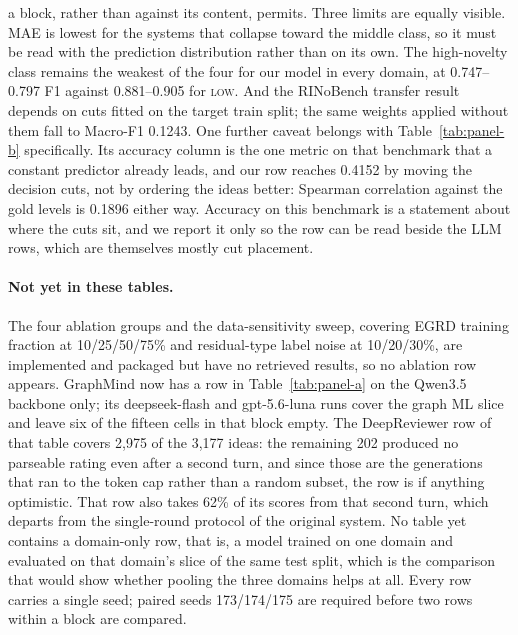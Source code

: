 a block, rather than against its content, permits.
Three limits are equally visible. MAE is lowest for the systems that collapse
toward the middle class, so it must be read with the prediction distribution
rather than on its own. The high-novelty class remains the weakest of the four
for our model in every domain, at 0.747--0.797 F1 against 0.881--0.905 for
\textsc{low}. And the RINoBench transfer result depends on cuts fitted on the
target train split; the same weights applied without them fall to Macro-F1
0.1243.
One further caveat belongs with Table~\ref{tab:panel-b} specifically. Its
accuracy column is the one metric on that benchmark that a constant predictor
already leads, and our row reaches 0.4152 by moving the decision cuts, not by
ordering the ideas better: Spearman correlation against the gold levels is
0.1896 either way. Accuracy on this benchmark is a statement about where the
cuts sit, and we report it only so the row can be read beside the LLM rows,
which are themselves mostly cut placement.

\paragraph{Not yet in these tables.}
The four ablation groups and the data-sensitivity sweep, covering EGRD training
fraction at 10/25/50/75\% and residual-type label noise at 10/20/30\%, are
implemented and packaged but have no retrieved results, so no ablation row
appears. GraphMind now has a row in Table~\ref{tab:panel-a} on the Qwen3.5
backbone only; its deepseek-flash and gpt-5.6-luna runs cover the graph ML slice
and leave six of the fifteen cells in that block empty. The DeepReviewer row of that table covers 2{,}975
of the 3{,}177 ideas: the remaining 202 produced no parseable rating even after
a second turn, and since those are the generations that ran to the token cap
rather than a random subset, the row is if anything optimistic. That row also
takes 62\% of its scores from that second turn, which departs from the
single-round protocol of the original system. No table yet contains a domain-only row, that is, a
model trained on one domain and evaluated on that domain's slice of the same test
split, which is the comparison that would show whether pooling the three domains
helps at all. Every row carries a single seed; paired seeds 173/174/175 are
required before two rows within a block are compared.
